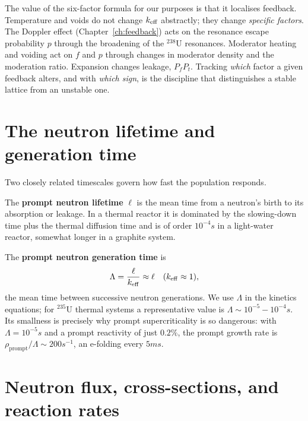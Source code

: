 The value of the six-factor formula for our purposes is that it localises
feedback. Temperature and voids do not change $k_{\mathrm{eff}}$ abstractly; they change
\emph{specific factors}. The Doppler effect (Chapter~\ref{ch:feedback}) acts on
the resonance escape probability $p$ through the broadening of the $^{238}$U
resonances. Moderator heating and voiding act on $f$ and $p$ through changes in
moderator density and the moderation ratio. Expansion changes leakage,
$P_{\!f}P_{\!t}$. Tracking \emph{which} factor a given feedback alters, and with
\emph{which sign}, is the discipline that distinguishes a stable lattice from an
unstable one.


\section{The neutron lifetime and generation time}

Two closely related timescales govern how fast the population responds.

The \textbf{prompt neutron lifetime} $\ell$ is the mean time from a neutron's
birth to its absorption or leakage. In a thermal reactor it is dominated by the
slowing-down time plus the thermal diffusion time and is of order
$10^{-4}\unit{s}$ in a light-water reactor, somewhat longer in a graphite system.

The \textbf{prompt neutron generation time} is
\begin{equation}
\Lambda = \frac{\ell}{k_{\mathrm{eff}}}\approx \ell \quad(k_{\mathrm{eff}}\approx 1),
\end{equation}
the mean time between successive neutron generations. We use $\Lambda$ in the
kinetics equations; for $^{235}$U thermal systems a representative value is
$\Lambda\sim 10^{-5}\!-\!10^{-4}\unit{s}$. Its smallness is precisely why prompt
supercriticality is so dangerous: with $\Lambda=10^{-5}\unit{s}$ and a prompt
reactivity of just $0.2\%$, the prompt growth rate is
$\rho_{\text{prompt}}/\Lambda\sim 200\unit{s^{-1}}$, an e-folding every
$5\unit{ms}$.

\section{Neutron flux, cross-sections, and reaction rates}

